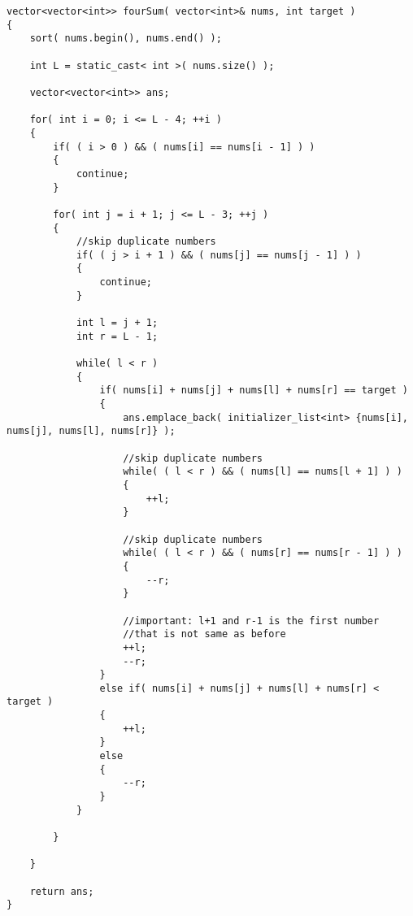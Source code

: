\setcounter{lstlisting}{0}
\begin{lstlisting}[style=customc, caption={Sorting}]
vector<vector<int>> fourSum( vector<int>& nums, int target )
{
    sort( nums.begin(), nums.end() );

    int L = static_cast< int >( nums.size() );

    vector<vector<int>> ans;

    for( int i = 0; i <= L - 4; ++i )
    {
        if( ( i > 0 ) && ( nums[i] == nums[i - 1] ) )
        {
            continue;
        }

        for( int j = i + 1; j <= L - 3; ++j )
        {
            //skip duplicate numbers
            if( ( j > i + 1 ) && ( nums[j] == nums[j - 1] ) )
            {
                continue;
            }

            int l = j + 1;
            int r = L - 1;

            while( l < r )
            {
                if( nums[i] + nums[j] + nums[l] + nums[r] == target )
                {
                    ans.emplace_back( initializer_list<int> {nums[i], nums[j], nums[l], nums[r]} );

                    //skip duplicate numbers
                    while( ( l < r ) && ( nums[l] == nums[l + 1] ) )
                    {
                        ++l;
                    }

                    //skip duplicate numbers
                    while( ( l < r ) && ( nums[r] == nums[r - 1] ) )
                    {
                        --r;
                    }

                    //important: l+1 and r-1 is the first number
                    //that is not same as before
                    ++l;
                    --r;
                }
                else if( nums[i] + nums[j] + nums[l] + nums[r] < target )
                {
                    ++l;
                }
                else
                {
                    --r;
                }
            }

        }

    }

    return ans;
}

\end{lstlisting}
